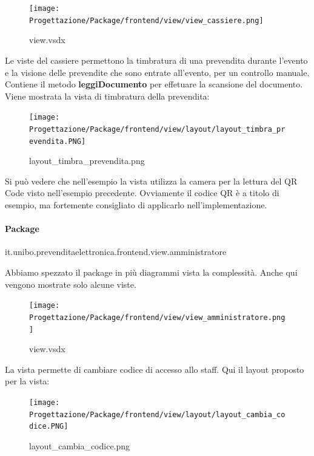 \documentclass[a4paper]{article}
\begin{document}

\begin{figure}[H]
    \texttt{[image: Progettazione/Package/frontend/view/view\_cassiere.png]}
    \centering
    \caption{view.vsdx}
\end{figure}

Le viste del cassiere permettono la timbratura di una prevendita durante l'evento e la visione delle prevendite che sono entrate all'evento, per un controllo manuale. Contiene il metodo \textbf{leggiDocumento} per effetuare la scansione del documento. Viene mostrata la vista di timbratura della prevendita:

\begin{figure}[H]
    \texttt{[image: Progettazione/Package/frontend/view/layout/layout\_timbra\_prevendita.PNG]}
    \centering
    \caption{layout\_timbra\_prevendita.png}
\end{figure}

Si può vedere che nell'esempio la vista utilizza la camera per la lettura del QR Code visto nell'esempio precedente. Ovviamente il codice QR è a titolo di esempio, ma fortemente consigliato di applicarlo nell'implementazione.

\newpage

\paragraph{Package} it.unibo.prevenditaelettronica.frontend.view.amministratore


Abbiamo spezzato il package in più diagrammi vista la complessità. Anche qui vengono mostrate solo alcune viste.


\begin{figure}[H]
    \texttt{[image: Progettazione/Package/frontend/view/view\_amministratore.png]}
    \centering
    \caption{view.vsdx}
\end{figure}

La vista permette di cambiare codice di accesso allo staff. Qui il layout proposto per la vista:

\begin{figure}[H]
    \texttt{[image: Progettazione/Package/frontend/view/layout/layout\_cambia\_codice.PNG]}
    \centering
    \caption{layout\_cambia\_codice.png}
\end{figure}
\end{document}

